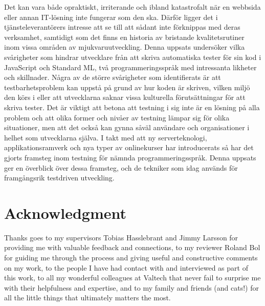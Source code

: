 Det kan vara både opraktiskt, irriterande och ibland katastrofalt när en webbsida eller annan IT-lösning inte fungerar som den ska. Därför ligger det i tjänsteleverantörers intresse att se till att sådant inte förknippas med deras verksamhet, samtidigt som det finns en historia av bristande kvalitetsrutiner inom vissa områden av mjukvaruutveckling. Denna uppsats undersöker vilka svårigheter som hindrar utvecklare från att skriva automatiska tester för sin kod i JavaScript och Standard ML, två programmeringsspråk med intressanta likheter och skillnader. Några av de större svårigheter som identifierats är att testbarhetsproblem kan uppstå på grund av hur koden är skriven, vilken miljö den körs i eller att utvecklarna saknar vissa kulturella förutsättningar för att skriva tester. Det är viktigt att betona att testning i sig inte är en lösning på alla problem och att olika former och nivåer av testning lämpar sig för olika situationer, men att det också kan gynna såväl användare och organisationer i helhet som utvecklarna själva. I takt med att ny serverteknologi, applikationsramverk och nya typer av onlinekurser har introducerats så har det gjorts framsteg inom testning för nämnda programmeringsspråk. Denna uppsats ger en överblick över dessa framsteg, och de tekniker som idag används för framgångsrik testdriven utveckling.

\newpage
\clearpage\mbox{}\clearpage
\newpage

\section*{Acknowledgment}

Thanks goes to my supervisors Tobias Hasslebrant and Jimmy Larsson for providing me with valuable feedback and connections, to my reviewer Roland Bol for guiding me through the process and giving useful and constructive comments on my work, to the people I have had contact with and interviewed as part of this work, to all my wonderful colleagues at Valtech that never fail to surprise me with their helpfulness and expertise, and to my family and friends (and cats!) for all the little things that ultimately matters the most.

\newpage
\clearpage\mbox{}\clearpage
\newpage

\tableofcontents

\newpage
\clearpage\mbox{}\clearpage
\newpage

